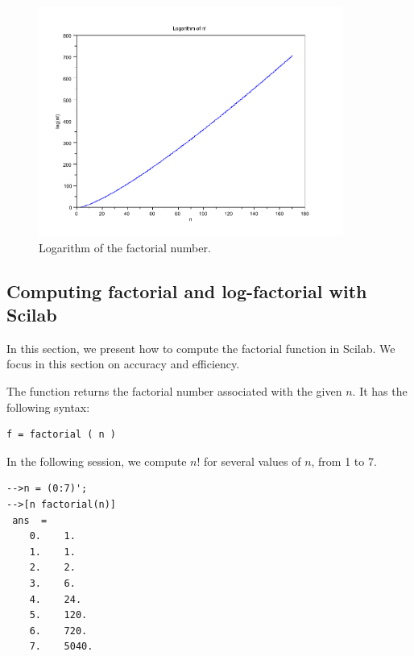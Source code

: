 \begin{figure}
\begin{center}
\includegraphics[width=10cm]{introdiscreteprobas/log_factorial.pdf}
\end{center}
\caption{Logarithm of the factorial number.}
\label{fig-introstats-logfact}
\end{figure}

\subsection{Computing factorial and log-factorial with Scilab}

In this section, we present how to compute the factorial function in Scilab. 
We focus in this section on accuracy and efficiency.

The  function returns the factorial 
number associated with the given $n$. It has the following 
syntax:
\lstset{language=scilabscript}
\begin{lstlisting}
f = factorial ( n )
\end{lstlisting}
In the following session, we compute $n!$ for 
several values of $n$, from 1 to 7.
\lstset{language=scilabscript}
\begin{lstlisting}
-->n = (0:7)';
-->[n factorial(n)]
 ans  =
    0.    1.     
    1.    1.     
    2.    2.     
    3.    6.     
    4.    24.    
    5.    120.   
    6.    720.   
    7.    5040.  
\end{lstlisting}

